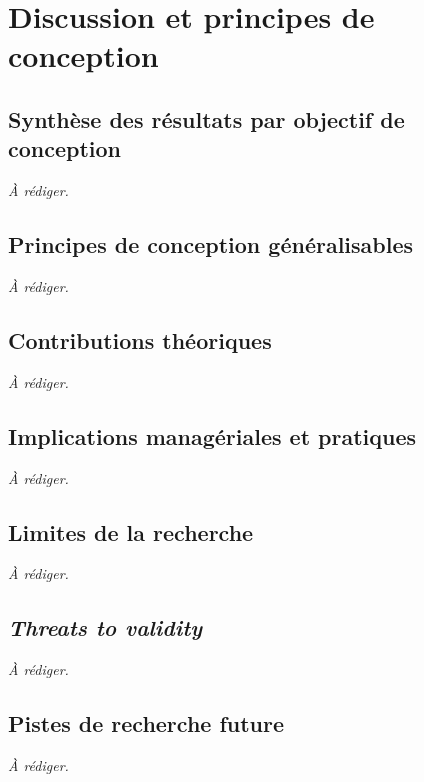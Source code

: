 \chapter{Discussion et principes de conception}\label{chap:discussion}


\section{Synth\`ese des r\'esultats par objectif de conception}\label{sec:disc-synthese}

\textit{\`A r\'ediger.}

\section{Principes de conception g\'en\'eralisables}\label{sec:disc-principes}

\textit{\`A r\'ediger.}

\section{Contributions th\'eoriques}\label{sec:disc-theorie}

\textit{\`A r\'ediger.}

\section{Implications manag\'eriales et pratiques}\label{sec:disc-managerial}

\textit{\`A r\'ediger.}

\section{Limites de la recherche}\label{sec:disc-limites}

\textit{\`A r\'ediger.}

\section{\emph{Threats to validity}}\label{sec:disc-threats}

\textit{\`A r\'ediger.}

\section{Pistes de recherche future}\label{sec:disc-future}

\textit{\`A r\'ediger.}
